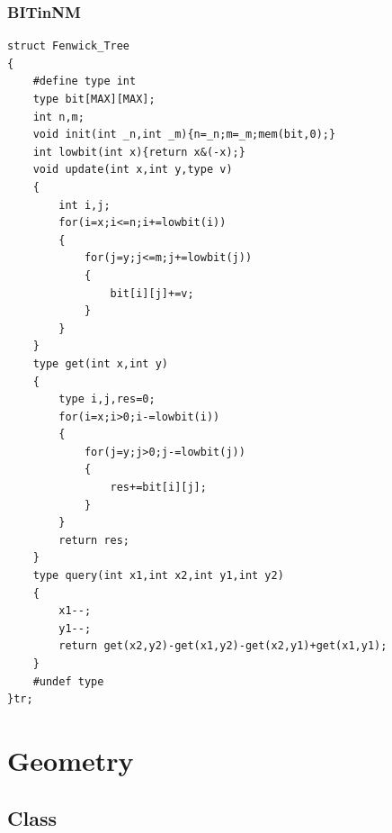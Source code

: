 \documentclass[twoside]{article}
\begin{document}
\subsubsection{BITinNM}
\begin{lstlisting}
struct Fenwick_Tree
{
	#define type int
	type bit[MAX][MAX];
	int n,m;
	void init(int _n,int _m){n=_n;m=_m;mem(bit,0);}
	int lowbit(int x){return x&(-x);}
	void update(int x,int y,type v)
	{
		int i,j;
		for(i=x;i<=n;i+=lowbit(i))
		{
			for(j=y;j<=m;j+=lowbit(j))
			{
				bit[i][j]+=v;
			}
		}
	}
	type get(int x,int y)
	{
		type i,j,res=0;
		for(i=x;i>0;i-=lowbit(i))
		{
			for(j=y;j>0;j-=lowbit(j))
			{
				res+=bit[i][j];
			}
		}
		return res;
	}
	type query(int x1,int x2,int y1,int y2)
	{
		x1--;
		y1--;
		return get(x2,y2)-get(x1,y2)-get(x2,y1)+get(x1,y1);
	}
	#undef type
}tr;\end{lstlisting}
\clearpage\section{Geometry}
\subsection{Class}
\end{document}
